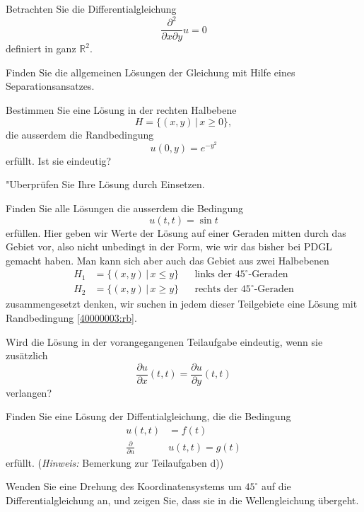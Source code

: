 Betrachten Sie die Differentialgleichung
\[
\frac{\partial^2}{\partial x\partial y}u=0
\]
definiert in ganz $\mathbb R^2$.
\begin{teilaufgaben}
\item
Finden Sie die allgemeinen Lösungen der Gleichung
mit Hilfe eines Separationsansatzes.
\item
Bestimmen Sie eine Lösung in der rechten Halbebene
\[
H=\{(x,y)\,|\, x\ge 0\},
\]
die ausserdem die Randbedingung
\[
u(0,y)=e^{-y^2}
\]
erfüllt. Ist sie eindeutig?
\item
"Uberprüfen Sie Ihre Lösung durch Einsetzen.
\item
Finden Sie alle Lösungen die ausserdem die Bedingung
\begin{equation}
u(t,t)=\sin t
\label{40000003:rb}
\end{equation}
erfüllen. Hier geben wir Werte der Lösung auf einer Geraden
mitten durch das Gebiet vor, also nicht unbedingt in der Form,
wie wir das bisher bei PDGL gemacht haben. Man kann sich aber
auch das Gebiet aus zwei Halbebenen
\begin{align*}
H_1&=\{(x,y)\,|\,x\le y\}&&\text{links der $45^\circ$-Geraden}
\\
H_2&=\{(x,y)\,|\,x\ge y\}&&\text{rechts der $45^\circ$-Geraden}
\end{align*}
zusammengesetzt denken, wir suchen in jedem dieser Teilgebiete eine
Lösung mit Randbedingung \eqref{40000003:rb}.
\label{40000003:halbebenen}
\item
Wird die Lösung in der vorangegangenen Teilaufgabe eindeutig, wenn sie
zusätzlich
\[
\frac{\partial u}{\partial x}(t,t)=\frac{\partial u}{\partial y}(t,t)
\]
verlangen?
\item
Finden Sie eine Lösung der Diffentialgleichung, die
die Bedingung
\begin{align*}
u(t,t)&=f(t)\\
\frac{\partial}{\partial n}&u(t,t)=g(t)
\end{align*}
erfüllt. ({\it Hinweis:} Bemerkung zur Teilaufgaben d))
\item
Wenden Sie eine Drehung des Koordinatensystems um $45^\circ$
auf die Differentialgleichung an, und zeigen Sie,
dass sie in die Wellengleichung übergeht.
\end{teilaufgaben}

